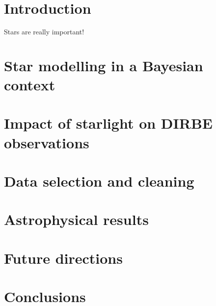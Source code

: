 \documentclass{aa}
\begin{document}
   \maketitle

\setcounter{tocdepth}{2}
\tableofcontents
   
\section{Introduction}
Stars are really important!

\clearpage
\section{Star modelling in a Bayesian context}


\clearpage
\section{Impact of starlight on DIRBE observations}




\clearpage
\section{Data selection and cleaning}


\clearpage
\section{Astrophysical results}

\clearpage
\section{Future directions}

\clearpage
\section{Conclusions}




\blindtext
\end{document}
